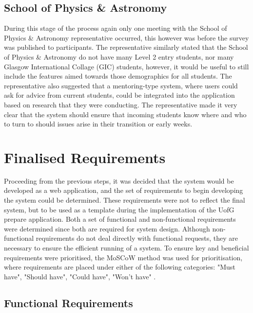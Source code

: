\documentclass{l4proj}
\begin{document}
\subsection{School of Physics \& Astronomy}
During this stage of the process again only one meeting with the School of Physics \& Astronomy representative occurred,  this however was before the survey was published to participants. The representative similarly stated that the School of Physics \& Astronomy do not have many Level 2 entry students,  nor many Glasgow International Collage (GIC) students,  however,  it would be useful to still include the features aimed towards those demographics for all students. The representative also suggested that a mentoring-type system,  where users could ask for advice from current students,  could be integrated into the application based on research that they were conducting. The representative made it very clear that the system should ensure that incoming students know where and who to turn to should issues arise in their transition or early weeks.

\section{Finalised Requirements} \label{requirements}
Proceeding from the previous steps,  it was decided that the system would be developed as a web application,  and the set of requirements to begin developing the system could be determined. These requirements were not to reflect the final system,  but to be used as a template during the implementation of the UofG prepare application. Both a set of functional and non-functional requirements were determined since both are required for system design. Although non-functional requirements do not deal directly with functional requests,  they are necessary to ensure the efficient running of a system. To ensure key and beneficial requirements were prioritised,  the MoSCoW method was used for prioritisation,  where requirements are placed under either of the following categories: "Must have",  "Should have",  "Could have",  "Won't have" \citep{Monday.com_2024}.

\subsection{Functional Requirements}
\end{document}
